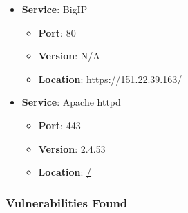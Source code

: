 \documentclass{article}
\begin{document}
\begin{itemize}
    
        \item \textbf{Service}: BigIP
        \begin{itemize}
            \item \textbf{Port}: 80
            \item \textbf{Version}:  N/A 
            \item \textbf{Location}: \href{ https://151.22.39.163/ }{ https://151.22.39.163/ }
        \end{itemize}
    
        \item \textbf{Service}: Apache httpd
        \begin{itemize}
            \item \textbf{Port}: 443
            \item \textbf{Version}:  2.4.53 
            \item \textbf{Location}: \href{ / }{ / }
        \end{itemize}
    
\end{itemize}


\subsubsection*{Vulnerabilities Found}
\end{document}
